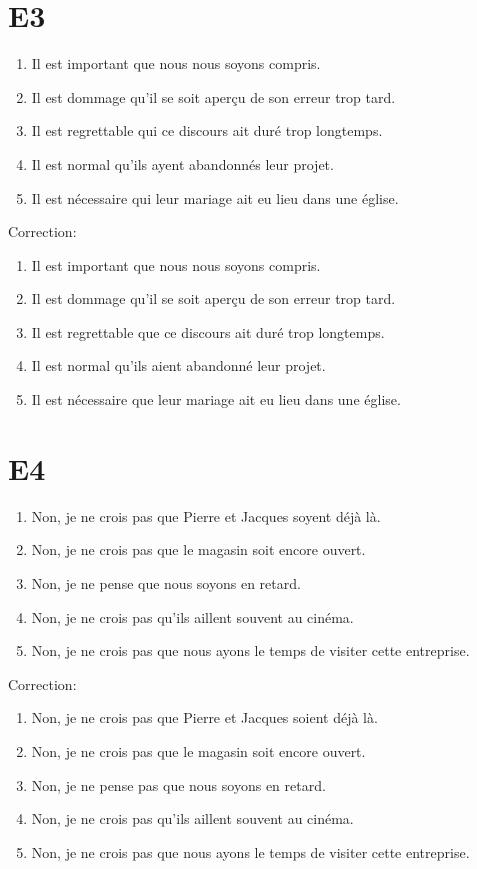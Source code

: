 \documentclass{book}
\begin{document}
    \section{E3}
        \begin{enumerate}
            \item Il est important que nous nous soyons compris.
            \item Il est dommage qu'il se soit aperçu de son erreur trop tard.
            \item Il est regrettable qui ce discours ait duré trop longtemps.
            \item Il est normal qu'ils ayent abandonnés leur projet.
            \item Il est nécessaire qui leur mariage ait eu lieu dans une église.
        \end{enumerate}
        Correction:
        \begin{enumerate}
            \item Il est important que nous nous soyons compris.
            \item Il est dommage qu'il se soit aperçu de son erreur trop tard.
            \item Il est regrettable que ce discours ait duré trop longtemps.
            \item Il est normal qu'ils aient abandonné leur projet.
            \item Il est nécessaire que leur mariage ait eu lieu dans une église.
        \end{enumerate}

    \section{E4}
        \begin{enumerate}
            \item Non, je ne crois pas que Pierre et Jacques soyent déjà là.
            \item Non, je ne crois pas que le magasin soit encore ouvert.
            \item Non, je ne pense que nous soyons en retard.
            \item Non, je ne crois pas qu'ils aillent souvent au cinéma.
            \item Non, je ne crois pas que nous ayons le temps de visiter cette entreprise.
        \end{enumerate}
        Correction:
        \begin{enumerate}
            \item Non, je ne crois pas que Pierre et Jacques soient déjà là.
            \item Non, je ne crois pas que le magasin soit encore ouvert.
            \item Non, je ne pense pas que nous soyons en retard.
            \item Non, je ne crois pas qu'ils aillent souvent au cinéma.
            \item Non, je ne crois pas que nous ayons le temps de visiter cette entreprise.
        \end{enumerate}
\end{document}
